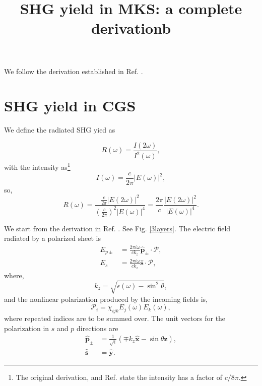 \documentclass{article}
\title{SHG yield in MKS: a complete derivationb}
\begin{document}
We follow the derivation established in Ref. \cite{mendozaEPI04}.

\section{SHG yield in CGS}

We define the radiated SHG yied as 

\begin{equation*}
R(\omega) = \frac{I(2\omega)}{I^{2}(\omega)},
\end{equation*}
with the intensity as\footnote{The original derivation, and Ref. \cite{reiningPRB94} state the intensity has a factor of $c/8\pi$.}
\begin{equation*}
I(\omega) = \frac{c}{2\pi}\vert E(\omega)\vert^{2},
\end{equation*}
so,
\begin{equation}\label{final}
R(\omega) = \frac{\frac{c}{2\pi}\vert E(2\omega)\vert^{2}}{(\frac{c}{2\pi})^{2}\vert E(\omega)\vert^{4}} = \frac{2\pi}{c}\frac{\vert E(2\omega)\vert^{2}}{\vert E(\omega)\vert^{4}}.
\end{equation}

We start from the derivation in Ref. \cite{mizrahiJOSA88}. See Fig. \ref{3layers}. The electric field radiated by a polarized sheet is
\begin{align}
E_{p\pm} &= \frac{2\pi i\omega}{c k_{z}}\hat{\mathbf{p}}_{\pm}\cdot\boldsymbol{\mathcal{P}},\label{eq:ep_miz}\\
E_{s} & = \frac{2\pi i\omega}{c k_{z}}\hat{\mathbf{s}}\cdot\boldsymbol{\mathcal{P}}\label{eq:es_miz},
\end{align}
where,
\begin{equation}
k_{z} = \sqrt{\epsilon(\omega) - \sin^{2}\theta},
\end{equation}
and the nonlinear polarization produced by the incoming fields is,
\begin{equation}
\mathcal{P}_{i}=\chi_{ijk}E_j(\omega)E_k(\omega),
\end{equation} 
where repeated indices are to be summed over. The unit vectors for the polarization in $s$ and $p$ directions are
\begin{align}
\hat{\mathbf{p}}_{\pm} &= \frac{1}{\sqrt{\epsilon}}(\mp k_{z}\hat{\mathbf{x}} - \sin\theta\hat{\mathbf{z}}),\label{eq:pvectors}\\
\hat{\mathbf{s}} &= \hat{\mathbf{y}}.\label{eq:svectors}
\end{align}
\end{document}

